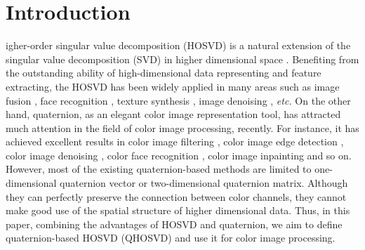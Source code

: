 \documentclass[journal]{IEEEtran}
\begin{document}
\section{Introduction}
igher-order singular value decomposition (HOSVD) is a natural extension of the singular value decomposition (SVD) in higher dimensional space \cite{DBLP:journals/siammax/LathauwerMV00}. Benefiting from the outstanding ability of  high-dimensional data representing and feature extracting, the HOSVD has been widely applied in many areas such as image fusion \cite{DBLP:journals/tip/LiangHLZ12}, face recognition \cite{2010Gurumoorthy}, texture synthesis \cite{2008HigherCostantini}, image denoising \cite{DBLP:journals/access/GaoGZCZ19}, \emph{etc.} On the other hand, quaternion, as an elegant color image representation tool, has attracted much attention in the
field of color image processing, recently.  For instance, it has achieved excellent results in color image filtering \cite{DBLP:journals/iet-ipr/ChenLSLS14}, color image edge detection \cite{Xiao2018Phase}, color image denoising \cite{DBLP:journals/tip/ChenXZ20,DBLP:journals/ijon/YuZY19}, color face recognition \cite{DBLP:journals/tip/ZouKW16,DBLP:journals/access/ZouKDZT19}, color image inpainting \cite{DBLP:journals/tsp/MiaoK20,DBLP:journals/nla/JiaNS19} and so on. However, most of the existing quaternion-based methods are limited to one-dimensional quaternion vector or two-dimensional quaternion matrix. Although they can perfectly preserve the connection between color channels, they cannot make good use of the spatial structure of higher dimensional data. Thus, in this paper, combining the advantages of HOSVD and quaternion, we aim to define quaternion-based HOSVD (QHOSVD) and use it for color image processing.
\end{document}
